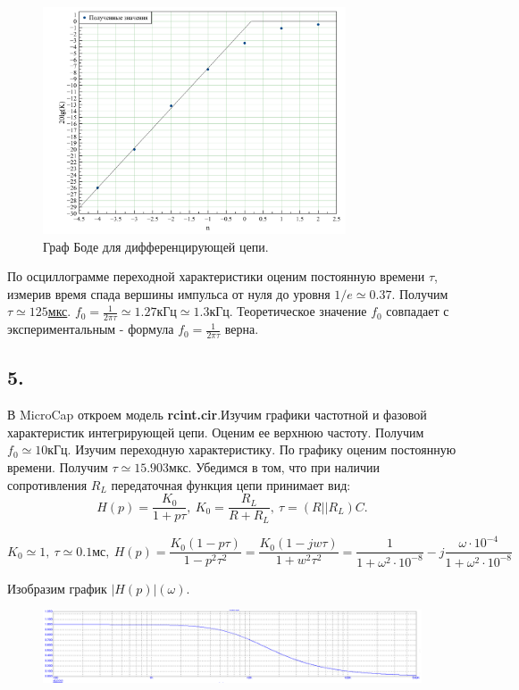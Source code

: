 \documentclass[a4paper, 12pt, twoside]{article}
\begin{document}
\begin{figure}[H]
	\centering
	\includegraphics[width = 0.8\textwidth]{bodediff}
	\caption{Граф Боде для дифференцирующей цепи.}
\end{figure}

По осциллограмме переходной характеристики оценим постоянную времени $\tau$, измерив время спада вершины импульса от нуля до уровня $1/e \simeq 0.37$. Получим \underline{$\tau \simeq 125$мкс}. $f_0 = \frac{1}{2\pi \tau} \simeq 1.27\text{кГц}\simeq 1.3{\text{кГц}}$. Теоретическое значение $f_0$ совпадает с экспериментальным - формула $f_0 = \frac{1}{2\pi \tau}$
верна.

\subsection*{5.}

В MicroCap откроем модель \textbf{rcint.cir}.Изучим графики частотной и фазовой характеристик интегрирующей цепи. Оценим ее верхнюю частоту. Получим $f_0 \simeq 10$кГц. Изучим переходную характеристику. По графику оценим постоянную времени. Получим $\tau \simeq 15.903$мкс. Убедимся в том, что при наличии сопротивления $R_L$ передаточная функция цепи принимает вид: $$H(p) = \dfrac{K_0}{1+p\tau},~ K_0 = \dfrac{R_L}{R+R_L},~ \tau =(R||R_L)C.$$

$$K_0 \simeq 1, ~ \tau \simeq 0.1\text{мс}, ~ H(p) = \dfrac{K_0(1-p\tau)}{1-p^2\tau^2} = \dfrac{K_0(1-jw\tau)}{1+w^2\tau^2} = \dfrac{1}{1+\omega^2\cdot10^{-8}} - j\dfrac{\omega \cdot 10^{-4}}{1+\omega^2\cdot10^{-8}}$$

Изобразим график $|H(p)|(\omega)$.

\begin{figure}[H]
	\centering
	\includegraphics[width = 1\textwidth]{H(p)int}
	
\end{figure}
\end{document}
